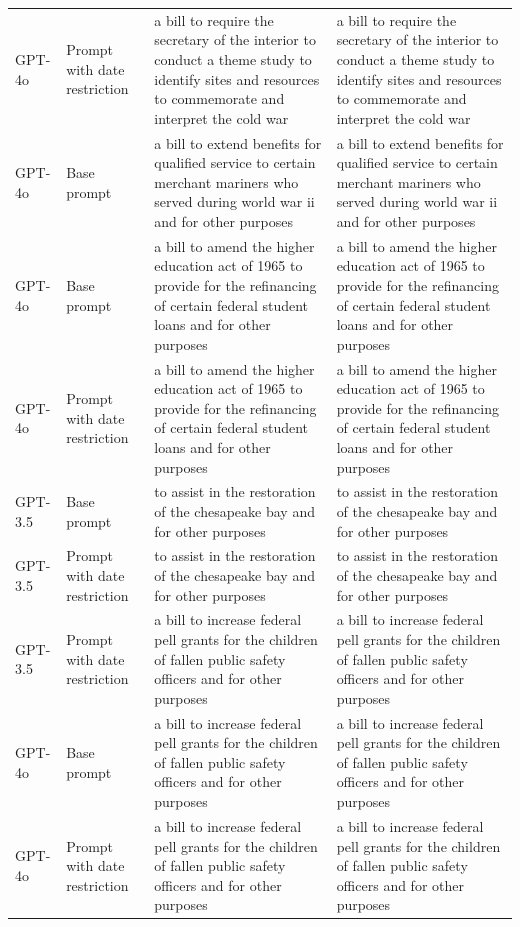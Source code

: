 \begin{longtable}{>{\raggedright\arraybackslash}p{1.4cm}>{\raggedright\arraybackslash}p{1.4cm}>{\raggedright\arraybackslash}p{5.5cm}>{\raggedright\arraybackslash}p{5.5cm}}
GPT-4o & Prompt with date restriction & a bill to require the secretary of the interior to conduct a theme study to identify sites and resources to commemorate and interpret the cold war & a bill to require the secretary of the interior to conduct a theme study to identify sites and resources to commemorate and interpret the cold war\\
GPT-4o & Base prompt & a bill to extend benefits for qualified service to certain merchant mariners who served during world war ii and for other purposes & a bill to extend benefits for qualified service to certain merchant mariners who served during world war ii and for other purposes\\
GPT-4o & Base prompt & a bill to amend the higher education act of 1965 to provide for the refinancing of certain federal student loans and for other purposes & a bill to amend the higher education act of 1965 to provide for the refinancing of certain federal student loans and for other purposes\\
GPT-4o & Prompt with date restriction & a bill to amend the higher education act of 1965 to provide for the refinancing of certain federal student loans and for other purposes & a bill to amend the higher education act of 1965 to provide for the refinancing of certain federal student loans and for other purposes\\
GPT-3.5 & Base prompt & to assist in the restoration of the chesapeake bay and for other purposes & to assist in the restoration of the chesapeake bay and for other purposes\\
GPT-3.5 & Prompt with date restriction & to assist in the restoration of the chesapeake bay and for other purposes & to assist in the restoration of the chesapeake bay and for other purposes\\
GPT-3.5 & Prompt with date restriction & a bill to increase federal pell grants for the children of fallen public safety officers and for other purposes & a bill to increase federal pell grants for the children of fallen public safety officers and for other purposes\\
GPT-4o & Base prompt & a bill to increase federal pell grants for the children of fallen public safety officers and for other purposes & a bill to increase federal pell grants for the children of fallen public safety officers and for other purposes\\
GPT-4o & Prompt with date restriction & a bill to increase federal pell grants for the children of fallen public safety officers and for other purposes & a bill to increase federal pell grants for the children of fallen public safety officers and for other purposes\\

\end{longtable}
